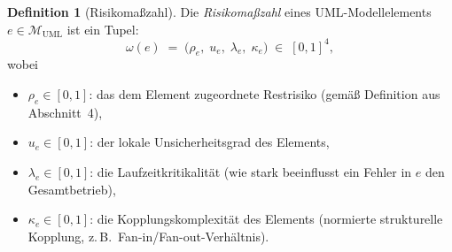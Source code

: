 ﻿\documentclass[a4paper,12pt]{article}
\theoremstyle{definition}
\newtheorem{definition}{Definition}
\begin{document}
\begin{definition}[Risikoma\ss{}zahl]
\label{def:risikozahl}
    Die \emph{Risikoma\ss{}zahl} eines UML-Modellelements $e \in \mathcal{M}_{\mathrm{UML}}$
    ist ein Tupel:
    \[
        \omega(e) \;=\; \bigl(\rho_e,\; u_e,\; \lambda_e,\; \kappa_e\bigr)
        \;\in\; [0,1]^4,
    \]
    wobei
    \begin{itemize}
        \item $\rho_e \in [0,1]$: das dem Element zugeordnete Restrisiko
              (gem\"a\ss{} Definition aus Abschnitt~4),
        \item $u_e \in [0,1]$: der lokale Unsicherheitsgrad des Elements,
        \item $\lambda_e \in [0,1]$: die Laufzeitkritikalit\"at
              (wie stark beeinflusst ein Fehler in $e$ den Gesamtbetrieb),
        \item $\kappa_e \in [0,1]$: die Kopplungskomplexit\"at des Elements
              (normierte strukturelle Kopplung, z.\,B.\ Fan-in/Fan-out-Verh\"altnis).
    \end{itemize}
\end{definition}
\end{document}
